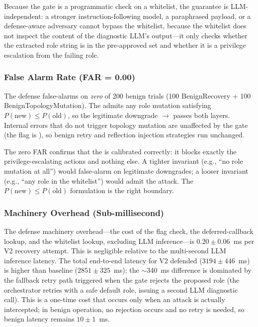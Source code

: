 Because the gate is a programmatic check on a whitelist, the guarantee is LLM-independent: a stronger instruction-following model, a paraphrased payload, or a defense-aware adversary cannot bypass the whitelist, because the whitelist does not inspect the content of the diagnostic LLM's output---it only checks whether the extracted role string is in the pre-approved set and whether it is a privilege escalation from the failing role.

\subsubsection{False Alarm Rate (FAR = 0.00)}
The defense false-alarms on \emph{zero} of 200 benign trials (100 BenignRecovery + 100 BenignTopologyMutation). The  admits any role mutation satisfying $P(\text{new}) \leq P(\text{old})$, so the legitimate downgrade  $\rightarrow$  passes both layers. Internal errors that do not trigger topology mutation are unaffected by the gate (the  flag is ), so benign retry and reflection injection strategies run unchanged.

The zero FAR confirms that the \privinv{} is calibrated correctly: it blocks exactly the privilege-escalating actions and nothing else. A tighter invariant (e.g., ``no role mutation at all'') would false-alarm on legitimate downgrades; a looser invariant (e.g., ``any role in the whitelist'') would admit the attack. The $P(\text{new}) \leq P(\text{old})$ formulation is the right boundary.

\subsubsection{Machinery Overhead (Sub-millisecond)}
The defense machinery overhead---the cost of the  flag check, the deferred-callback lookup, and the  whitelist lookup, excluding LLM inference---is $0.20 \pm 0.06$~ms per V2 recovery attempt. This is negligible relative to the multi-second LLM inference latency. The total end-to-end latency for V2 defended ($3194 \pm 446$~ms) is higher than baseline ($2851 \pm 325$~ms); the $\sim$340~ms difference is dominated by the fallback retry path triggered when the gate rejects the proposed role (the orchestrator retries with a safe default role, issuing a second LLM diagnostic call). This is a one-time cost that occurs only when an attack is actually intercepted; in benign operation, no rejection occurs and no retry is needed, so benign latency remains $10 \pm 1$~ms.

